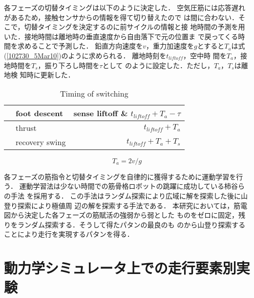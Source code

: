 \documentclass[10pt,a4paper]{jsarticle}
\begin{document}
各フェーズの切替タイミングは以下のように決定した．
空気圧筋には応答遅れがあるため，接触センサからの情報を得て切り替えたので
は間に合わない．そこで，切替タイミングを決定するのに前サイクルの情報と接
地時間の予測を用いた．接地時間は離地時の垂直速度から自由落下で元の位置ま
で戻ってくる時間を求めることで予測した．
鉛直方向速度を$v$，重力加速度を$g$とすると$T_{a}$は式(\ref{102730_5Mar10})のように求められる．
離地時刻を$t_{liftoff}$，空中時
間を$T_{a}$，接地時間を$T_{s}$，振り下ろし時間を$\tau$として
のように設定した．ただし，$T_{a}$，$T_{s}$は離地検
知時に更新した．



\vspace{-2mm}
\begin{table}[htbp]
 \caption{Timing of switching}
 \label{table:timing}
 \begin{center}
  \small
  \begin{tabularx}{85truemm}{cXr}
   \hline
   & foot descent & sense liftoff \& $t_{liftoff}+T_a-\tau$\\
   \hline
   & thrust & $t_{liftoff}+T_a$\\
   \hline
   & recovery swing & $t_{liftoff}+T_a+T_s$\\
   \hline
  \end{tabularx}   
 \end{center}
\vspace{-5mm}
\end{table}

\begin{equation}
T_{a}=2v/g\label{102730_5Mar10}
\end{equation}

\vspace{-1mm}
各フェーズの筋指令と切替タイミングを自律的に獲得するために運動学習を行う．
運動学習法は少ない時間での筋骨格ロボットの跳躍に成功している柿谷らの手法
\cite{Kakitani2009:筋骨格ロボットを用いた跳躍運動の学習}を採用する．
この手法はランダム探索により広域に解を探索した後に山登り探索により極値周
辺の解を探索する手法である．
本研究においては，筋電図から決定した各フェーズの筋賦活の強弱から弱とした
ものをゼロに固定，残りをランダム探索する．そうして得たパタンの最良のも
のから山登り探索することにより走行を実現するパタンを得る．

\vspace{-1mm}
\section{動力学シミュレータ上での走行要素別実験}
\vspace{-1mm}
\end{document}
